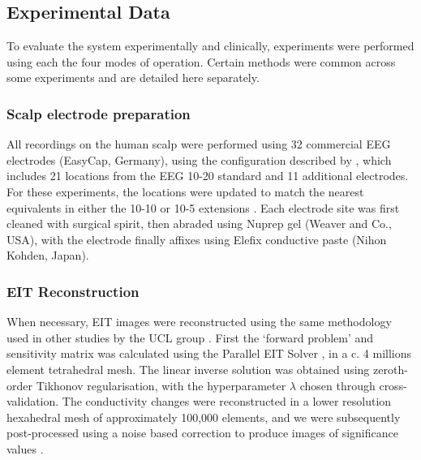 \subsection{Experimental Data}

To evaluate the system experimentally and clinically, experiments were performed using each the four modes of operation. Certain methods were common across some experiments and are detailed here separately. 

\subsubsection{Scalp electrode preparation}
All recordings on the human scalp were performed using 32 commercial EEG electrodes (EasyCap, Germany), using the configuration described by \citet{tidswell2001three}, which includes 21 locations from the EEG 10-20 standard \cite{Jasper1958} and 11 additional electrodes. For these experiments, the locations were updated to match the nearest equivalents in either the 10-10 or 10-5 extensions \cite{Oostenveld2001}. Each electrode site was first cleaned with surgical spirit, then abraded using Nuprep gel (Weaver and Co., USA), with the electrode finally affixes using Elefix conductive paste (Nihon Kohden, Japan). 

\subsubsection{EIT Reconstruction}
When necessary, EIT images were reconstructed using the same methodology used in other studies by the UCL group \cite{Dowrick_2016,Aristovich_2016,Aristovich_2014}. First the `forward problem' and sensitivity matrix was calculated using the Parallel EIT Solver \cite{Jehl2014}, in a c. 4 millions element tetrahedral mesh. The linear inverse solution was obtained using zeroth-order Tikhonov regularisation, with the hyperparameter $\lambda$ chosen through cross-validation.  The conductivity changes were reconstructed in a lower resolution hexahedral mesh of approximately 100,000 elements, and we were subsequently post-processed using a noise based correction to produce images of significance values \cite{Aristovich_2016}.